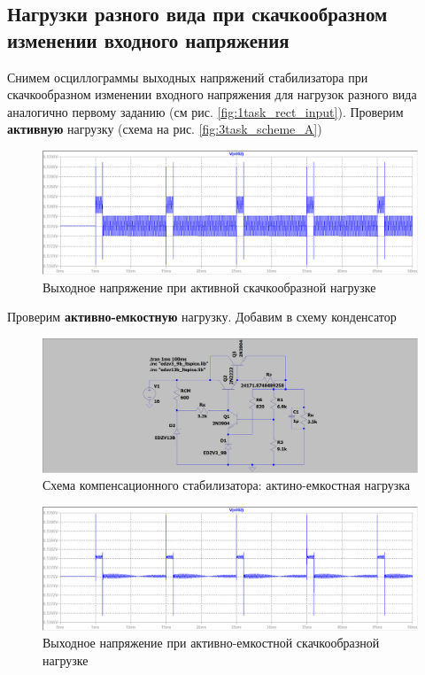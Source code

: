 \documentclass[a4paper, 12pt]{article}
\begin{document}
    \subsection{Нагрузки разного вида при скачкообразном изменении входного напряжения}
    Снимем осциллограммы выходных напряжений стабилизатора при скачкообразном
    изменении входного напряжения для нагрузок разного вида аналогично первому заданию (см рис. \ref{fig:1task_rect_input}).
    Проверим \textbf{активную} нагрузку (схема на рис. \ref{fig:3task_scheme_A})
    \begin{figure}[H]
        \centering
        \includegraphics[scale=0.46]{3task_rect_A.png}
        \captionsetup{skip=0pt}
        \caption{Выходное напряжение при активной скачкообразной нагрузке}
        \label{fig:3task_rect_A}
    \end{figure}
    \noindent Проверим \textbf{активно-емкостную} нагрузку. Добавим в схему конденсатор
    \begin{figure}[H]
        \centering
        \includegraphics[scale=0.22]{3task_scheme_AC.png}
        \captionsetup{skip=0pt}
        \caption{Схема компенсационного стабилизатора: актино-емкостная нагрузка}
        \label{fig:3task_scheme_AC}
    \end{figure}
    \begin{figure}[H]
        \centering
        \includegraphics[scale=0.46]{3task_rect_AC.png}
        \captionsetup{skip=0pt}
        \caption{Выходное напряжение при активно-емкостной скачкообразной нагрузке}
        \label{fig:3task_rect_AC}
    \end{figure}
\end{document}
